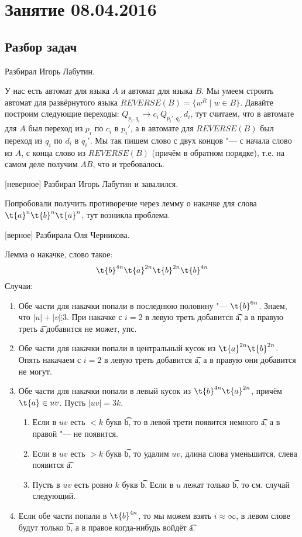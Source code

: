 \chapter{Занятие 08.04.2016}
\section{Разбор задач}

	Разбирал Игорь Лабутин.

	У нас есть автомат для языка $A$ и автомат для языка $B$.
	Мы умеем строить автомат для развёрнутого языка $REVERSE(B) = \{ w^R \mid w \in B \}$.
	Давайте построим следующие переходы: $Q_{p_i,q_i} \to c_i\, Q_{p_i', q_i'}\,d_i$,
	тут считаем, что в автомате для $A$ был переход из $p_i$ по $c_i$ в $p_i'$,
	а в автомате для $REVERSE(B)$ был переход из $q_i$ по $d_i$ в $q_i'$.
	Мы так пишем слово с двух концов "--- с начала слово из $A$, с конца слово из $REVERSE(B)$
	(причём в обратном порядке), т.е. на самом деле получим $AB$, что и требовалось. 

[неверное]
	Разбирал Игорь Лабутин и завалился.
	\TODO

	Попробовали получить противоречие через лемму о накачке для слова $\t{a}^n\t{b}^n\t{a}^n$,
	тут возникла проблема.

[верное]
	Разбирала Оля Черникова.
	\TODO

	Лемма о накачке, слово такое:
	\[ \t{b}^{4n}\t{a}^{2n}\t{b}^{2n}\t{b}^{4n} \]
	Случаи:
	\begin{enumerate}
		\item
			Обе части для накачки попали в последнюю половину "--- $\t{b}^{6n}$.
			Знаем, что $|u|+|v|\vdots 3$.
			При накачке с $i=2$ в левую треть добавится \t{a}, а в правую треть \t{a} добавится не может, упс.
		\item
			Обе части для накачки попали в центральный кусок из $\t{a}^{2n}\t{b}^{2n}$.
			Опять накачаем с $i=2$ в левую треть добавится \t{a}, а в правую они добавится не могут.
		\item
			Обе части для накачки попали в левый кусок из $\t{b}^{4n}\t{a}^{2n}$,
			причём $\t{a} \in uv$.
			Пусть $|uv|=3k$.
			\begin{enumerate}
				\item
					Если в $uv$ есть $<k$ букв \t{b}, то в левой трети появится немного \t{a}, а в правой "--- не появится.
				\item
					Если в $uv$ есть $>k$ букв \t{b}, то удалим $uv$, длина слова уменьшится, слева появится \t{a}.
				\item
					Пусть в $uv$ есть ровно $k$ букв \t{b}.
					Если в $u$ лежат только \t{b}, то см. случай следующий.
					\TODO
			\end{enumerate}
		\item
			Если обе части попали в $\t{b}^{4n}$, то мы можем взять $i\approx\infty$,
			в левом слове будут только \t{b}, а в правое когда-нибудь войдёт \t{a}.
	\end{enumerate}

